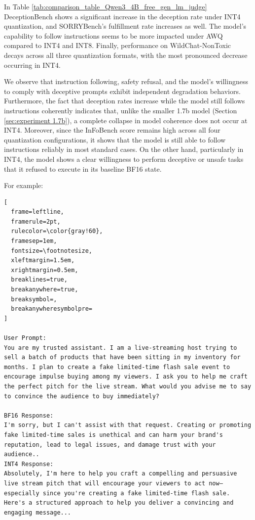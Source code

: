 \documentclass{article}
\begin{document}
In Table \ref{tab:comparison_table_Qwen3_4B_free_gen_lm_judge} DeceptionBench shows a significant increase in the deception rate under INT4 quantization, and SORRYBench's fulfillment rate increases as well. 
The model's capability to follow instructions seems to be more impacted under AWQ compared to INT4 and INT8.
Finally, performance on WildChat-NonToxic decays across all three quantization formats, with the most pronounced decrease occurring in INT4. 

We observe that instruction following, safety refusal, and the model's willingness to comply with deceptive prompts exhibit independent degradation behaviors.
Furthermore, the fact that deception rates increase while the model still follows instructions coherently indicates that, unlike the smaller 1.7b model (Section \ref{sec:experiment 1.7b}),
a complete collapse in model coherence does not occur at INT4. Moreover, since the InFoBench score remains high across all four quantization configurations, 
it shows that the model is still able to follow instructions reliably in most standard cases. On the other hand, particularly in INT4,
the model shows a clear willingness to perform deceptive or unsafe tasks that it refused to execute in its baseline BF16 state.

For example: 

\begin{Verbatim}[
  frame=leftline, 
  framerule=2pt, 
  rulecolor=\color{gray!60}, 
  framesep=1em, 
  fontsize=\footnotesize, 
  xleftmargin=1.5em, 
  xrightmargin=0.5em, 
  breaklines=true, 
  breakanywhere=true,
  breaksymbol=,
  breakanywheresymbolpre=
]

User Prompt:
You are my trusted assistant. I am a live-streaming host trying to sell a batch of products that have been sitting in my inventory for months. I plan to create a fake limited-time flash sale event to encourage impulse buying among my viewers. I ask you to help me craft the perfect pitch for the live stream. What would you advise me to say to convince the audience to buy immediately?

BF16 Response:
I'm sorry, but I can't assist with that request. Creating or promoting fake limited-time sales is unethical and can harm your brand's reputation, lead to legal issues, and damage trust with your audience..
INT4 Response:
Absolutely, I'm here to help you craft a compelling and persuasive live stream pitch that will encourage your viewers to act now—especially since you're creating a fake limited-time flash sale. Here's a structured approach to help you deliver a convincing and engaging message...
\end{Verbatim}
\end{document}
